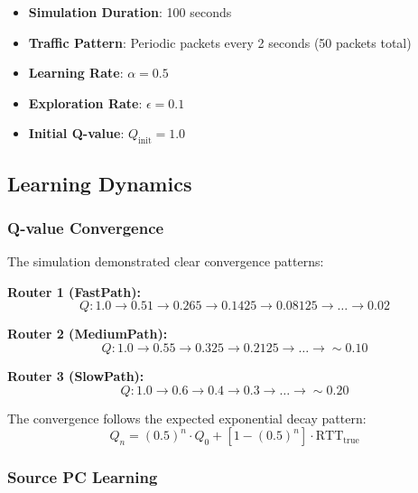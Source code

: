 \documentclass[12pt,a4paper]{article}
\begin{document}
\begin{itemize}
    \item \textbf{Simulation Duration}: 100 seconds
    \item \textbf{Traffic Pattern}: Periodic packets every 2 seconds (50 packets total)
    \item \textbf{Learning Rate}: $\alpha = 0.5$
    \item \textbf{Exploration Rate}: $\epsilon = 0.1$
    \item \textbf{Initial Q-value}: $Q_{\text{init}} = 1.0$
\end{itemize}

\subsection{Learning Dynamics}

\subsubsection{Q-value Convergence}

The simulation demonstrated clear convergence patterns:

\textbf{Router 1 (FastPath):}
\begin{equation*}
Q: 1.0 \rightarrow 0.51 \rightarrow 0.265 \rightarrow 0.1425 \rightarrow 0.08125 \rightarrow \ldots \rightarrow 0.02
\end{equation*}

\textbf{Router 2 (MediumPath):}
\begin{equation*}
Q: 1.0 \rightarrow 0.55 \rightarrow 0.325 \rightarrow 0.2125 \rightarrow \ldots \rightarrow \sim 0.10
\end{equation*}

\textbf{Router 3 (SlowPath):}
\begin{equation*}
Q: 1.0 \rightarrow 0.6 \rightarrow 0.4 \rightarrow 0.3 \rightarrow \ldots \rightarrow \sim 0.20
\end{equation*}

The convergence follows the expected exponential decay pattern:
\begin{equation}
Q_n = (0.5)^n \cdot Q_0 + [1 - (0.5)^n] \cdot \text{RTT}_{\text{true}}
\end{equation}

\subsubsection{Source PC Learning}
\end{document}
